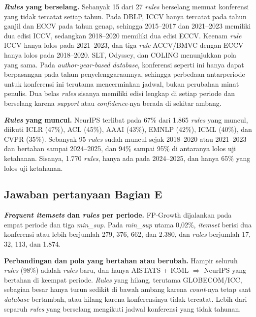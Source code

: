 \textbf{\textit{Rules} yang berselang.} Sebanyak 15 dari 27 \textit{rules} berselang memuat konferensi yang tidak tercatat setiap tahun. Pada DBLP, ICCV hanya tercatat pada tahun ganjil dan ECCV pada tahun genap, sehingga 2015--2017 dan 2021--2023 memiliki dua edisi ICCV, sedangkan 2018--2020 memiliki dua edisi ECCV. Keenam \textit{rule} ICCV hanya lolos pada 2021--2023, dan tiga \textit{rule} ACCV/BMVC dengan ECCV hanya lolos pada 2018--2020. SLT, Odyssey, dan COLING menunjukkan pola yang sama. Pada \textit{author-year-based database}, konferensi seperti ini hanya dapat berpasangan pada tahun penyelenggaraannya, sehingga perbedaan antarperiode untuk konferensi ini terutama mencerminkan jadwal, bukan perubahan minat penulis. Dua belas \textit{rules} sisanya memiliki edisi lengkap di setiap periode dan berselang karena \textit{support} atau \textit{confidence}-nya berada di sekitar ambang.

\textbf{\textit{Rules} yang muncul.} NeurIPS terlibat pada 67\% dari 1.865 \textit{rules} yang muncul, diikuti ICLR (47\%), ACL (45\%), AAAI (43\%), EMNLP (42\%), ICML (40\%), dan CVPR (35\%). Sebanyak 95 \textit{rules} sudah muncul sejak 2018--2020 atau 2021--2023 dan bertahan sampai 2024--2025, dan 94\% sampai 95\% di antaranya lolos uji ketahanan. Sisanya, 1.770 \textit{rules}, hanya ada pada 2024--2025, dan hanya 65\% yang lolos uji ketahanan.

\subsection{Jawaban pertanyaan Bagian E}
\label{sec:jawab-e}
\textbf{\textit{Frequent itemsets} dan \textit{rules} per periode.} FP-Growth dijalankan pada empat periode dan tiga \textit{min\_sup}. Pada \textit{min\_sup} utama 0,02\%, \textit{itemset} berisi dua konferensi atau lebih berjumlah 279, 376, 662, dan 2.380, dan \textit{rules} berjumlah 17, 32, 113, dan 1.874.

\textbf{Perbandingan dan pola yang bertahan atau berubah.} Hampir seluruh \textit{rules} (98\%) adalah \textit{rules} baru, dan hanya AISTATS + ICML $\Rightarrow$ NeurIPS yang bertahan di keempat periode. \textit{Rules} yang hilang, terutama GLOBECOM/ICC, sebagian besar hanya turun sedikit di bawah ambang karena \textit{count}-nya tetap saat \textit{database} bertambah, atau hilang karena konferensinya tidak tercatat. Lebih dari separuh \textit{rules} yang berselang mengikuti jadwal konferensi yang tidak tahunan.

